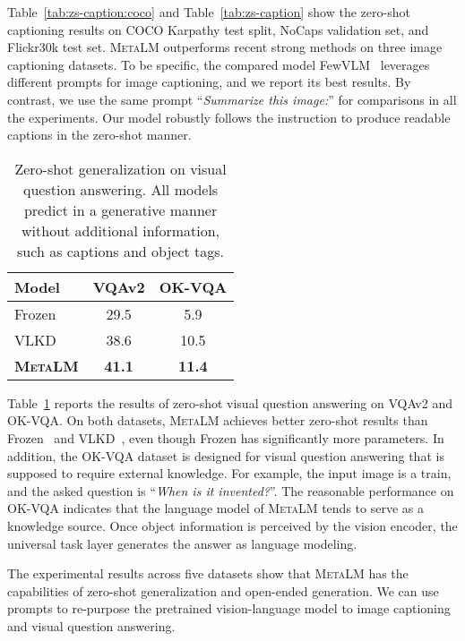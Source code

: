 \documentclass{article}
\theoremstyle{plain}
\theoremstyle{definition}
\theoremstyle{remark}
\newcommand\ours{\textsc{MetaLM}}
\begin{document}
Table~\ref{tab:zs-caption:coco} and Table~\ref{tab:zs-caption} show the zero-shot captioning results on COCO Karpathy test split, NoCaps validation set, and Flickr30k test set.
\ours{} outperforms recent strong methods on three image captioning datasets.
To be specific, the compared model FewVLM~\citep{jin2022fewVLM} leverages different prompts for image captioning, and we report its best results.
By contrast, we use the same prompt ``\textit{Summarize this image:}'' for comparisons in all the experiments.
Our model robustly follows the instruction to produce readable captions in the zero-shot manner.


\begin{table}[t]
\centering
\begin{tabular}{@{}l cc@{}}
\toprule
{\textbf{Model}} & {\textbf{VQAv2}} & {\textbf{OK-VQA}} \\
\midrule
Frozen~\citep{tsimpoukelli2021frozen} & 29.5 & 5.9  \\
VLKD~\citep{dai2021enabling} & 38.6 & 10.5 \\
\textbf{\ours{}} & \textbf{41.1} & \textbf{11.4} \\
\bottomrule
\end{tabular}
\caption{Zero-shot generalization on visual question answering. All models predict in a generative manner without additional information, such as captions and object tags.}
\label{tab:vl:zero-shot-vqa}
\end{table}

Table~\ref{tab:vl:zero-shot-vqa} reports the results of zero-shot visual question answering on VQAv2 and OK-VQA.
On both datasets, \ours{} achieves better zero-shot results than Frozen~\citep{tsimpoukelli2021frozen} and VLKD~\citep{dai2021enabling}, even though Frozen has significantly more parameters.
In addition, the OK-VQA dataset is designed for visual question answering that is supposed to require external knowledge.
For example, the input image is a train, and the asked question is ``\textit{When is it invented?}''.
The reasonable performance on OK-VQA indicates that the language model of \ours{} tends to serve as a knowledge source.
Once object information is perceived by the vision encoder, the universal task layer generates the answer as language modeling.

The experimental results across five datasets show that \ours{} has the capabilities of zero-shot generalization and open-ended generation.
We can use prompts to re-purpose the pretrained vision-language model to image captioning and visual question answering.
\end{document}
